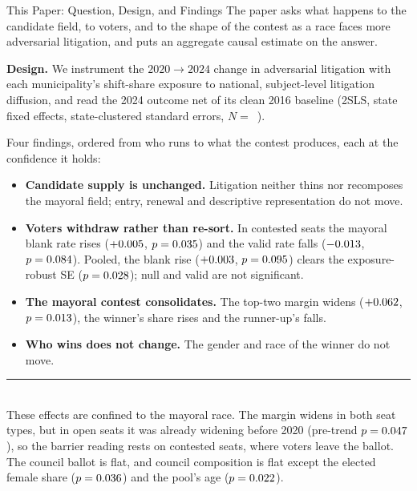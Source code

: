 



\begin{frame}{This Paper: Question, Design, and Findings}
\hypertarget{src:thispaper}{}
\footnotesize
The paper asks what happens to the candidate field, to voters, and to the shape of the contest as a race faces more adversarial litigation, and puts an aggregate causal estimate on the answer.
\smallskip

{\setlength{\fboxsep}{6pt}%
\colorbox{mylight}{\parbox{0.96\textwidth}{%
\textbf{\textcolor{myblue}{Design.}} We instrument the $2020\!\to\!2024$ change in adversarial litigation with each municipality's shift-share exposure to national, subject-level litigation diffusion, and read the 2024 outcome net of its clean 2016 baseline (2SLS, state fixed effects, state-clustered standard errors, $N=$~\NMunis{}).}}}
\smallskip

Four findings, ordered from who runs to what the contest produces, each at the confidence it holds:
\begin{itemize}\itemsep1pt
  \item \textbf{Candidate supply is unchanged.} Litigation neither thins nor recomposes the mayoral field; entry, renewal and descriptive representation do not move.
  \item \textbf{Voters withdraw rather than re-sort.} In contested seats the mayoral blank rate rises ($+0.005$, $p=0.035$) and the valid rate falls ($-0.013$, $p=0.084$). Pooled, the blank rise ($+0.003$, $p=0.095$) clears the exposure-robust SE ($p=0.028$); null and valid are not significant. 
  \item \textbf{The mayoral contest consolidates.} The top-two margin widens ($+0.062$, $p=0.013$), the winner's share rises and the runner-up's falls. 
  \item \textbf{Who wins does not change.} The gender and race of the winner do not move.
\end{itemize}
\smallskip
\rule{\linewidth}{0.4pt}\\[3pt]
{\footnotesize These effects are confined to the mayoral race. The margin widens in both seat types, but in open seats it was already widening before 2020 (pre-trend $p=0.047$), so the barrier reading rests on contested seats, where voters leave the ballot. The council ballot is flat, and council composition is flat except the elected female share ($p=0.036$) and the pool's age ($p=0.022$).}
\end{frame}
